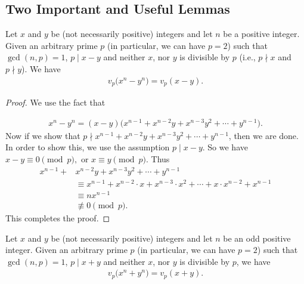 \documentclass[main.tex]{subfile}
\begin{document}
\subsection{Two Important and Useful Lemmas}

    \begin{lemma}\label{lem:lte-firstlemma}
         Let $x$ and $y$ be (not necessarily positive) integers and let $n$ be a positive integer. Given an arbitrary prime $p$ (in particular, we can have $p=2$) such that $ \gcd(n,p) = 1$, $p \mid  x - y$ and neither $x$, nor $y$ is divisible by $p$ (i.e., $p \nmid x$ and $p \nmid y$).  We have
           \begin{align*}
	            v_p\big(  x^n - y^n \big) = v_p(  x - y ).
           \end{align*}
    \end{lemma}

    \begin{proof}
        We use the fact that

        \begin{align*}
        x^n - y^n = (x - y)\big(x^{n - 1} + x^{n - 2}y + x^{n - 3}y^2 + \cdots + y^{n - 1}\big).
        \end{align*}
        Now if we show that $p \nmid x^{n - 1} + x^{n - 2}y + x^{n - 3}y^2 + \cdots + y^{n - 1}$, then we are done.
        In order to show this, we use the assumption $p \mid x-y.$  So we have $x-y \equiv 0 \pmod p,$
        or $x \equiv y \pmod p.$  Thus
        \begin{align*}
        x^{n - 1} + & x^{n - 2}y + x^{n - 3}y^2 + \cdots + y^{n - 1} \\
        & \equiv x^{n-1} +x^{n-2}  \cdot x +x^{n - 3} \cdot x^2 +\cdots +x \cdot x^{n-2} + x^{n-1} \\
        & \equiv n x^{n-1} \\
        & \not\equiv 0 \pmod p.
        \end{align*}
        This completes the proof.
       \end{proof}


    \begin{lemma}\label{secondlemma}
        Let $ x$ and $y$ be (not necessarily positive) integers and let $n$ be an odd positive integer. Given an arbitrary prime $p$ (in particular, we can have $p=2$) such that $ \gcd(n,p) = 1$, $p\mid x + y$ and neither $x$, nor $y$ is divisible by $p$, we have
        \begin{align*}
	        v_p\big(  x^n + y^n \big) = v_p ( x + y ).
        \end{align*}
    \end{lemma}
\end{document}
